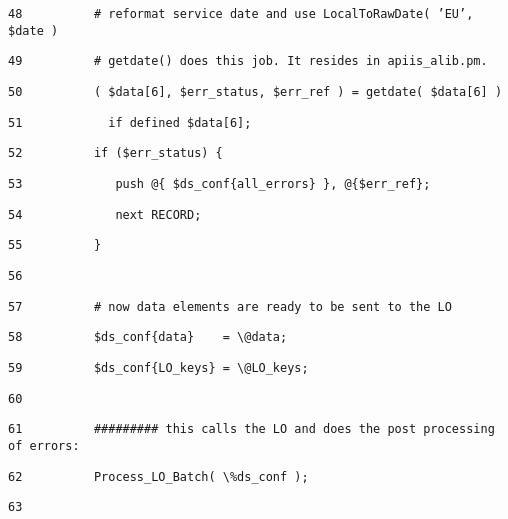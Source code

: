 \begin{table}[htbp]
\texttt{\scriptsize 48~~~~~~~~~ \# reformat service date
and use LocalToRawDate( 'EU', \$date )}{\scriptsize \par}

\texttt{\scriptsize 49~~~~~~~~~ \# getdate() does this job. It
resides in apiis\_alib.pm.}{\scriptsize \par}

\texttt{\scriptsize 50~~~~~~~~~ ( \$data{[}6{]}, \$err\_status,
\$err\_ref ) = getdate( \$data{[}6{]} )}{\scriptsize \par}

\texttt{\scriptsize 51~~~~~~~~~~~ if defined \$data{[}6{]};}{\scriptsize \par}

\texttt{\scriptsize 52~~~~~~~~~ if (\$err\_status) \{}{\scriptsize \par}

\texttt{\scriptsize 53~~~~~~~~~~~~ push @\{ \$ds\_conf\{all\_errors\}
\}, @\{\$err\_ref\};}{\scriptsize \par}

\texttt{\scriptsize 54~~~~~~~~~~~~ next RECORD;}{\scriptsize \par}

\texttt{\scriptsize 55~~~~~~~~~ \}}{\scriptsize \par}

\texttt{\scriptsize 56 }{\scriptsize \par}

\texttt{\scriptsize 57~~~~~~~~~ \# now data elements are
ready to be sent to the LO}{\scriptsize \par}

\texttt{\scriptsize 58~~~~~~~~~ \$ds\_conf\{data\}~~~
= \textbackslash{}@data;}{\scriptsize \par}

\texttt{\scriptsize 59~~~~~~~~~ \$ds\_conf\{LO\_keys\} =
\textbackslash{}@LO\_keys;}{\scriptsize \par}

\texttt{\scriptsize 60 }{\scriptsize \par}

\texttt{\scriptsize 61~~~~~~~~~ \#\#\#\#\#\#\#\#\# this calls
the LO and does the post processing of errors:}{\scriptsize \par}

\texttt{\scriptsize 62~~~~~~~~~ Process\_LO\_Batch( \textbackslash{}\%ds\_conf
);}{\scriptsize \par}

\texttt{\scriptsize 63 }{\scriptsize \par}


\end{table}
